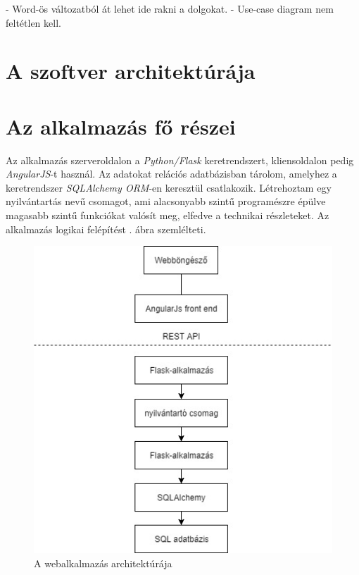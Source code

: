 - Word-ös változatból át lehet ide rakni a dolgokat.
- Use-case diagram nem feltétlen kell.

\section{A szoftver architektúrája}





\section{Az alkalmazás fő részei}

Az alkalmazás szerveroldalon a \textit{Python/Flask} keretrendszert, kliensoldalon pedig \textit{AngularJS}-t használ. Az adatokat relációs adatbázisban tárolom, amelyhez a keretrendszer \textit{SQLAlchemy ORM}-en keresztül csatlakozik. Létrehoztam egy nyilvántartás nevű csomagot, ami alacsonyabb szintű programészre épülve magasabb szintű funkciókat valósít meg, elfedve a technikai részleteket. Az alkalmazás logikai felépítést . ábra szemlélteti.

\begin{figure}
\centering
\includegraphics[scale=0.8]{kepek/architecture.jpg}
\caption{A webalkalmazás architektúrája}
\label{fig:architecture}
\end{figure}


